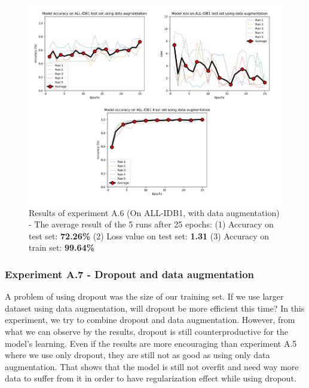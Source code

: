 \documentclass[11pt, openany]{report}
\theoremstyle{plain}
\theoremstyle{definition}
\theoremstyle{remark}
\begin{document}
\begin{figure}[H]
  \centering
  \includegraphics[scale=0.38]{Code/ch6-LeukemiaSubtypes/figures_result/ALL_IDB1/all_idb1-data_aug.PNG}
  \caption{Results of experiment A.6 (On ALL-IDB1, with data augmentation) - The average result of the 5 runs after 25 epochs: (1) Accuracy on test set: \textbf{72.26\%} (2) Loss value on test set: \textbf{1.31} (3) Accuracy on train set: \textbf{99.64\%}}
  \label{fig:results-A6}
\end{figure}


\subsubsection{Experiment A.7 - Dropout and data augmentation} \label{sec:drop-dataaug-allidb1}
A problem of using dropout was the size of our training set. If we use larger dataset using data augmentation, will dropout be more efficient this time? In this experiment, we try to combine dropout and data augmentation. However, from what we can observe by the results, dropout is still counterproductive for the model's learning. Even if the results are more encouraging than experiment A.5 where we use only dropout, they are still not as good as using only data augmentation. That shows that the model is still not overfit and need way more data to suffer from it in order to have regularization effect while using dropout. 
\end{document}
